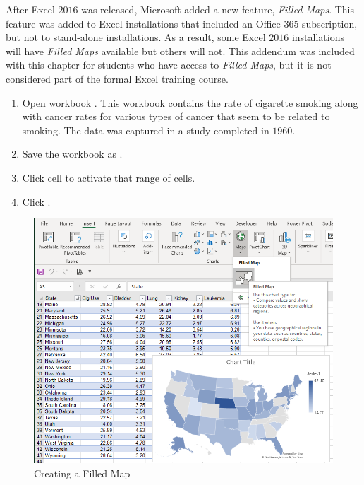 After Excel $ 2016 $ was released, Microsoft added a new feature, \textit{Filled Maps}. This feature was added to Excel installations that included an Office 365 subscription, but not to stand-alone installations. As a result, some Excel $ 2016 $ installations will have \textit{Filled Maps} available but others will not. This addendum was included with this chapter for students who have access to \textit{Filled Maps}, but it is not considered part of the formal Excel training course.

\begin{enumerate}
	\item Open workbook . This workbook contains the rate of cigarette smoking along with cancer rates for various types of cancer that seem to be related to smoking. The data was captured in a study completed in $ 1960 $.
	\item Save the workbook as .
	\item Click cell  to activate that range of cells.
	\item Click .
\end{enumerate}

\begin{figure}[H]
	\centering
	\includegraphics[width=\maxwidth{.95\linewidth}]{gfx/ch08_fig90}
	\caption{Creating a Filled Map}
	\label{08:fig90}
\end{figure}

